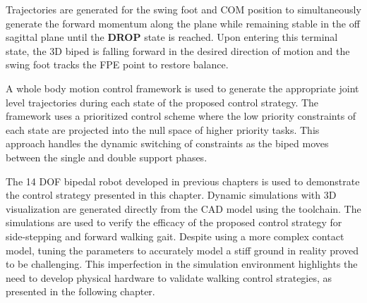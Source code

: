 Trajectories are generated for the swing foot and COM position to simultaneously generate the forward momentum along the plane while remaining stable in the off sagittal plane until the \textbf{DROP} state is reached. Upon entering this terminal state, the 3D biped is falling forward in the desired direction of motion and the swing foot tracks the FPE point to restore balance. 

A whole body motion control framework is used to generate the appropriate joint level trajectories during each state of the proposed control strategy. The framework uses a prioritized control scheme where the low priority constraints of each state are projected into the null space of higher priority tasks. This approach handles the dynamic switching of constraints as the biped moves between the single and double support phases. 

The 14 DOF bipedal robot developed in previous chapters is used to demonstrate the control strategy presented in this chapter. Dynamic simulations with 3D visualization are generated directly from the CAD model using the toolchain. The simulations are used to verify the efficacy of the proposed control strategy for side-stepping and forward walking gait. Despite using a more complex contact model, tuning the parameters to accurately model a stiff ground in reality proved to be challenging. This imperfection in the simulation environment highlights the need to develop physical hardware to validate walking control strategies, as presented in the following chapter.

